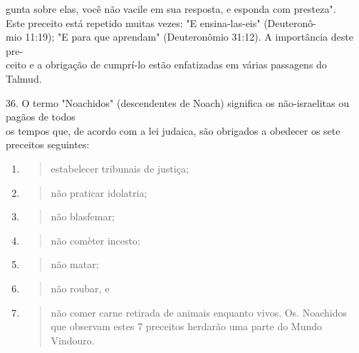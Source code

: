 gunta sobre elas, você não vacile em sua resposta, e esponda com
presteza".\\
Este preceito está repetido muitas vezes: "E ensina-las-eis"
(Deuteronô-\\
mio 11:19); "E para que aprendam" (Deuteronômio 31:12). A importância
deste pre-\\
ceito e a obrigação de cumprí-lo estão enfatizadas em várias passagens
do Talmud.

36. O termo "Noachidos" (descendentes de Noach) significa os
não-israelitas ou pagãos de todos\\
os tempos que, de acordo com a lei judaica, são obrigados a obedecer os
sete preceitos seguintes:

\begin{enumerate}
\def\labelenumi{(\arabic{enumi})}
\item
  \begin{quote}
  estabelecer tribunais de justiça;
  \end{quote}
\item
  \begin{quote}
  não praticar idolatria;
  \end{quote}
\item
  \begin{quote}
  não blasfemar;
  \end{quote}
\item
  \begin{quote}
  não comèter incesto;
  \end{quote}
\item
  \begin{quote}
  não matar;
  \end{quote}
\item
  \begin{quote}
  não roubar, e
  \end{quote}
\item
  \begin{quote}
  não comer carne retirada de animais enquanto vivos. Os. Noachidos que
  obser­vam estes 7 preceitos herdarão uma parte do Mundo Vindouro.
  \end{quote}
\end{enumerate}

